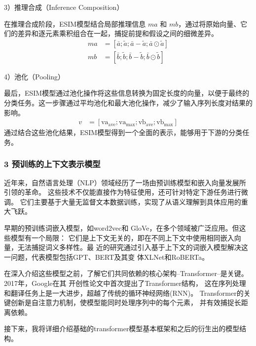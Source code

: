 3）推理合成（Inference Composition）

在推理合成阶段，ESIM模型结合局部推理信息 \( ma \) 和 \( mb \)，通过将原始向量、它们的差异和逐元素乘积组合在一起，捕捉前提和假设之间的细微差异。
\begin{align}
    ma &= [\bar{a}; \tilde{a}; \bar{a} - \tilde{a}; \bar{a} \odot \tilde{a}] \\
    mb &= [\bar{b}; \tilde{b}; \bar{b} - \tilde{b}; \bar{b} \odot \tilde{b}]
\end{align}

4）池化（Pooling）

最后，ESIM模型通过池化操作将这些信息转换为固定长度的向量，以便于最终的分类任务。这一步骤通过平均池化和最大池化操作，减少了输入序列长度对结果的影响。
\begin{align}
  v &= [\text{va}_{\text{ave}}; \text{va}_{\text{max}}; \text{vb}_{\text{ave}}; \text{vb}_{\text{max}}]
\end{align}
通过结合这些池化结果，ESIM模型得到一个全面的表示，能够用于下游的分类任务。

\subsubsection*{3 预训练的上下文表示模型}
近年来，自然语言处理（NLP）领域经历了一场由预训练模型和嵌入向量发展所引领的革命。
这些技术不仅能直接作为特征使用，还可针对特定下游任务进行微调。
它们主要基于大量无监督文本数据训练，实现了从语义理解到具体应用的重大飞跃。

早期的预训练词嵌入模型，如word2vec\cite{mikolov2013distributed}和
GloVe\cite{pennington2014glove}，在多个领域被广泛应用。但这些模型有一个局限：
它们是上下文无关的，即在不同上下文中使用相同嵌入向量，无法捕捉词义多样性。最
近的研究通过引入基于上下文的词嵌入模型解决这一问题，代表模型包括GPT、BERT及其变
体XLNet和RoBERTa。

在深入介绍这些模型之前，了解它们共同依赖的核心架构--Transformer--是关键。2017年，Google在其
开创性论文\cite{vaswani2017attention}中首次提出了Transformer结构，
这在序列处理和翻译任务上是一大进步，超越了传统的循环神经网络(RNN)。
Transformer的关键创新是自注意力机制，使模型能同时处理序列中的每个元素，
并有效捕捉长距离依赖。

%
%
接下来，我将详细介绍基础的transformer模型基本框架和之后的衍生出的模型结构。

